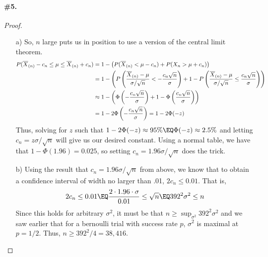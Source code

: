 \documentclass[12pt,titlepage]{article}\usepackage{graphicx, color}
\begin{document}
\paragraph{\#5.}
\begin{proof}
\begin{enumerate}
\item[a)] So, $n$ large puts us in position to use a version of the central limit theorem. 
\begin{align*}
P( \overline{X}_{(n)} - c_n \leq \mu \leq \overline{X}_{(n)} + c_n) &= 1 - \left( P(\overline{X}_{(n)} < \mu - c_n) + P(X_n > \mu + c_n) \right) \\
&= 1 - \left( P\left( \frac{\overline{X}_{(n)} - \mu}{\sigma/\sqrt{n}} < -\frac{c_n \sqrt{n}}{\sigma} \right) + 1 - P\left( \frac{\overline{X}_{(n)} - \mu}{\sigma/\sqrt{n}} \leq \frac{c_n \sqrt{n}}{\sigma} \right) \right)\\
&\approx 1 - \left( \Phi\left(-\frac{c_n \sqrt{n}}{\sigma}\right) + 1-\Phi\left(\frac{c_n \sqrt{n}}{\sigma}\right) \right) \\
&= 1 - 2\Phi\left(-\frac{c_n \sqrt{n}}{\sigma}\right) = 1 - 2 \Phi(-z)
\end{align*}
Thus, solving for $z$ such that $1-2\Phi(-z) \approx 95\% \EQ \Phi(-z) \approx 2.5\%$ and letting $c_n = z\sigma/\sqrt{n}$ will give us our desired constant. Using a normal table, we have that $1-\Phi(1.96) = 0.025$, so setting $c_n = 1.96 \sigma/\sqrt{n}$ does the trick.
% 
\item[b)] Using the result that $c_n = 1.96 \sigma/\sqrt{n}$ from above, we know that to obtain a confidence interval of width no larger than .01, $2 c_n \leq 0.01$. That is, 
\[
2 c_n \leq 0.01 \EQ \frac{2\cdot 1.96 \cdot \sigma}{0.01} \leq \sqrt{n} \EQ 392^2 \sigma^2 \leq n
\]
Since this holds for arbitrary $\sigma^2$, it must be that $n \geq \sup_{\sigma^2} 392^2 \sigma^2$ and we saw earlier that for a bernoulli trial with success rate $p$, $\sigma^2$ is maximal at $p = 1/2$. Thus, $n \geq 392^2/4 = 38,416$. 
\end{enumerate}
\end{proof}
\end{document}
